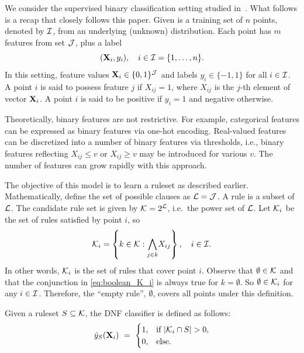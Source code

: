 We consider the supervised binary classification setting studied in~\cite{lawless_interpretable_2023}.
What follows is a recap that closely follows this paper.
Given is a training set of $n$ points, denoted by $\mathcal{I}$, from an underlying (unknown) distribution.
Each point has $m$ features from set $\mathcal{J}$, plus a label \[(\mathbf{X}_i, y_i), \quad i \in \mathcal{I} = \{1, \dots, n\}.\]
In this setting, feature values $\mathbf{X}_i \in \{0,1\}^{\mathcal{J}}$ and labels
$y_i \in \{-1,1\}$ for all $i \in \mathcal{I}$.
A point $i$ is said to possess feature $j$ if $X_{ij} = 1$, where $X_{ij}$ is the $j$-th element of vector $\mathbf{X}_{i}$.
A point $i$ is said to be positive if $y_i = 1$ and negative otherwise.

Theoretically, binary features are not restrictive.
For example, categorical features can be expressed as binary features via one-hot encoding.
Real-valued features can be discretized into a number of binary features via thresholds,
i.e., binary features reflecting $X_{ij} \leq v$ or $X_{ij} \geq v$ may be introduced for various $v$.
The number of features can grow rapidly with this approach.

The objective of this model is to learn a ruleset as described earlier.
Mathematically, define the set of possible clauses as $\mathcal{L} = \mathcal{J}$.
A rule is a subset of $\mathcal{L}$.
The candidate rule set is given by  $\mathcal{K} = 2^{\mathcal{L}}$, i.e.\ the power set of $\mathcal{L}$.
Let $\mathcal{K}_i$ be the set of rules satisfied by point $i$, so
\begin{equation}
    \mathcal{K}_i = \left\{k \in \mathcal{K} : \underset{j \in k}{\bigwedge} X_{ij} \right\}, \quad i \in \mathcal{I}. \label{eq:boolean_K_i}
\end{equation}
In other words, $\mathcal{K}_i$ is the set of rules that cover point $i$.
Observe that $\emptyset \in \mathcal{K}$ and that the conjunction in \eqref{eq:boolean_K_i}
is always true for $k=\emptyset$.
So $\emptyset \in \mathcal{K}_i$ for any $i \in \mathcal{I}$.
Therefore, the ``empty rule'', $\emptyset$, covers all points under this definition.



\begin{definition}\label{def:dnf_classifier}
    Given a ruleset $S \subseteq \mathcal{K}$, the DNF classifier is defined as follows:
    \[\hat{y}_S(\textbf{X}_i) ~=~
    \begin{cases}
        1, & \text{if } \lvert\mathcal{K}_i \cap S\rvert > 0, \\
        0, &\text{else.}
    \end{cases}\]
\end{definition}

